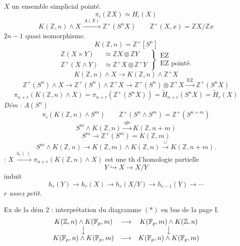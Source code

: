 \documentclass[11pt,a4paper]{article}
\begin{document}
$X$ un ensemble simplicial pointé.
\[
  \pi_i(\mathbb{Z}X) \simeq H_i(X)
\]
\[
  K(\mathbb{Z},n)\wedge X \xrightarrow{\ A(X)\ } \mathbb{Z}^{+}(S^nX)
  \qquad \mathbb{Z}^{+}(X,x) = \mathbb{Z}X/\mathbb{Z}x
\]
$2n-1$ quasi isomorphisme.
\[
  K(\mathbb{Z},n) = \mathbb{Z}^{+}[S^n]
\]
\[
  \left.\begin{aligned}
    \mathbb{Z}(X\times Y) &\simeq \mathbb{Z}X\otimes\mathbb{Z}Y \\
    \mathbb{Z}^{+}(X\wedge Y) &\simeq \mathbb{Z}^{+}X\otimes\mathbb{Z}^{+}Y
  \end{aligned}\right\}
  \ \begin{array}{l} \text{EZ} \\ \text{EZ pointé.} \end{array}
\]
\[
  K(\mathbb{Z},n)\wedge X \to K(\mathbb{Z},n)\wedge\mathbb{Z}^{+}X
\]
\[
  \mathbb{Z}^{+}(S^n)\wedge X \to \mathbb{Z}^{+}(S^n)\wedge\mathbb{Z}^{+}X
  \to \mathbb{Z}^{+}(S^n)\otimes\mathbb{Z}^{+}X \xrightarrow{\ \mathrm{EZ}\ } \mathbb{Z}^{+}(S^nX)
\]
\[
  \pi_{n+r}(K(\mathbb{Z},n)\wedge X) = \pi_{n+r}(\mathbb{Z}^{+}(S^nX))
  = \widetilde{H}_{n+r}(S^nX) = \widetilde{H}_r(X)
\]
\emph{Dém} : $A(S^n)$
\[
  \pi_i(K(\mathbb{Z},n)\wedge S^m) \qquad
  \mathbb{Z}^{+}(S^n\wedge S^m) = \mathbb{Z}^{+}(S^{n+m})
\]
\[
  S^m\wedge K(\mathbb{Z},n) \xrightarrow{\ \mathrm{qis}\ } K(\mathbb{Z},n+m)
\]
\[
  S^m \to \mathbb{Z}^{+}(S^m) = K(\mathbb{Z},m)
\]
\[
  S^m\wedge K(\mathbb{Z},n) \to K(\mathbb{Z},m)\wedge K(\mathbb{Z},n)
  \xrightarrow{\ \cup\ } K(\mathbb{Z},n+m).
\]
 : \quad $X \xrightarrow{\ h_r(\ )\ } \pi_{n+r}(K(\mathbb{Z},n)\wedge X)$ est une th d'homologie partielle
\[
  Y \hookrightarrow X \to X/Y
\]
induit
\[
  h_r(Y) \to h_r(X) \to h_r(X/Y) \to h_{r-1}(Y) \to \cdots
\]
\emph{$r$ assez petit.}

Ex de la dém 2 : interprétation du diagramme $(\ast)$ en bas de la page I.
\[
  \begin{array}{ccc}
    K(\mathbb{Z},n)\wedge K(\mathbb{F}_p,m) & \longrightarrow & K(\mathbb{F}_p,m)\wedge K(\mathbb{Z},n) \\
    \big\downarrow & & \big\downarrow \\
    K(\mathbb{F}_p,n)\wedge K(\mathbb{F}_p,m) & \longrightarrow & K(\mathbb{F}_p,n)\wedge K(\mathbb{F}_p,m)
  \end{array}
\]
\end{document}
